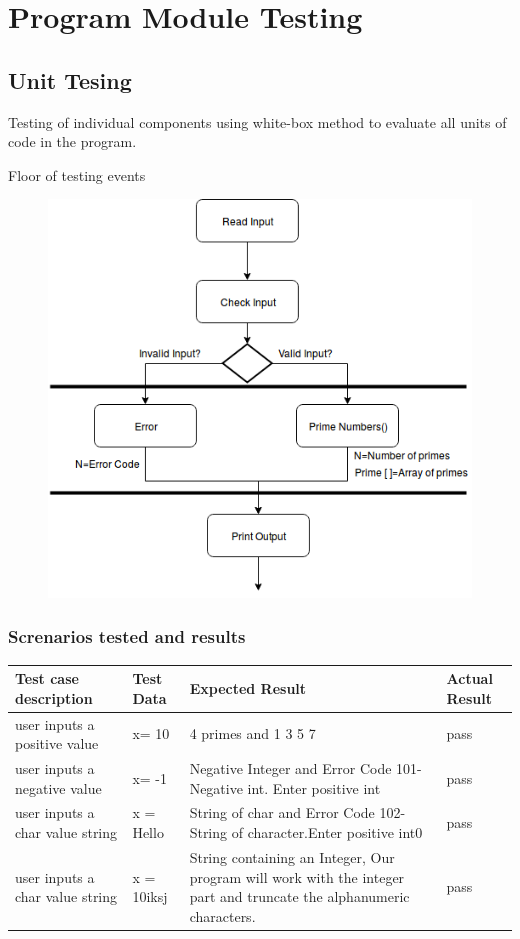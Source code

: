 \documentclass[11 pt]{article}
\begin{document}
\section{Program Module Testing}
\subsection{Unit Tesing}
Testing of individual components using white-box method to evaluate all units of code in the program.\\
\newpage

Floor of testing events
\begin{figure}[h]
    \centering
    
    \includegraphics[width=\linewidth]{Integration Testing.png}
    \end{figure}


\subsubsection{Screnarios tested and results}

\begin{tabular}{|p{4cm}|p{3cm}|p{4cm}|p{3cm}|}
\hline
\textbf{Test case description} &\textbf{Test Data} & \textbf{Expected Result} & \textbf{Actual Result}\\
\hline
 user inputs a positive value & x= 10 & 4 primes and 1 3 5 7 & pass\\
 \hline
user inputs a negative value  & x= -1 &  Negative Integer and  Error Code 101-Negative 	int. Enter positive int & pass \\
 \hline
user inputs a char value string & x = Hello &String of char and Error Code 102-String of     character.Enter positive int0
 & pass \\
 \hline
 user inputs a char value string & x = 10iksj & String containing an Integer,    Our program will work with the integer part and truncate the alphanumeric characters.
 & pass \\
 \hline
 \end{tabular}
\end{document}
